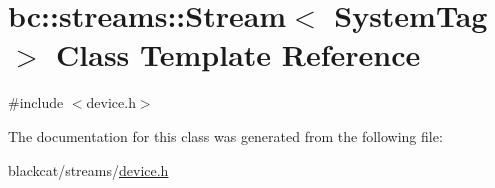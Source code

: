 \hypertarget{classbc_1_1streams_1_1Stream}{}\section{bc\+:\+:streams\+:\+:Stream$<$ System\+Tag $>$ Class Template Reference}
\label{classbc_1_1streams_1_1Stream}


{\ttfamily \#include $<$device.\+h$>$}



The documentation for this class was generated from the following file\+:\begin{DoxyCompactItemize}
\item 
blackcat/streams/\hyperlink{streams_2device_8h}{device.\+h}\end{DoxyCompactItemize}
